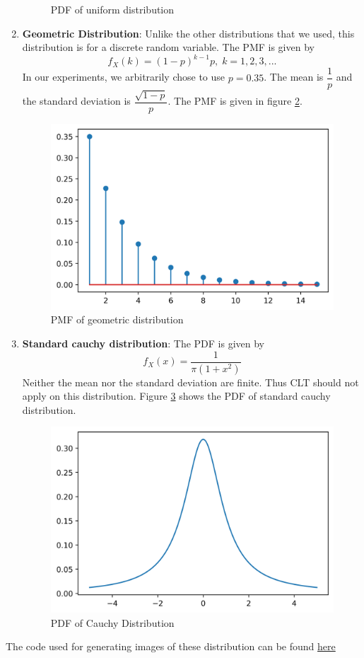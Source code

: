 \documentclass{article}
\begin{document}
\begin{enumerate}
\begin{figure}[H]
        \caption{PDF of uniform distribution}
        \label{uni_pdf}
    \end{figure}
    \item \textbf{Geometric Distribution}: Unlike the other distributions that we used, this distribution is for a discrete random variable. The PMF is given by
    $$f_X(k) = (1-p)^{k-1}p,\; k=1,2,3,...$$
    In our experiments, we arbitrarily chose to use $p=0.35$. The mean is $\dfrac{1}{p}$ and the standard deviation is $\dfrac{\sqrt{1-p}}{p}$. The PMF is given in figure \ref{geom_pmf}. 
    \begin{figure}[H]
        \centering
        \includegraphics[scale=0.5]{images/geometric.png}
        \caption{PMF of geometric distribution}
        \label{geom_pmf}
    \end{figure}
    \item \textbf{Standard cauchy distribution}: The PDF is given by $$f_X(x) = \dfrac{1}{\pi (1+x^2)}$$ Neither the mean nor the standard deviation are finite. Thus CLT should not apply on this distribution. Figure \ref{cauchy_pdf} shows the PDF of standard cauchy distribution.
    \begin{figure}[H]
        \centering
        \includegraphics[scale=0.4]{images/cauchy.png}
        \caption{PDF of Cauchy Distribution}
        \label{cauchy_pdf}
    \end{figure}
\end{enumerate}
The code used for generating images of these distribution can be found \href{https://github.com/cmaspi/verifying_CLT/blob/main/codes/distribution_images.ipynb}{here}
\end{document}
